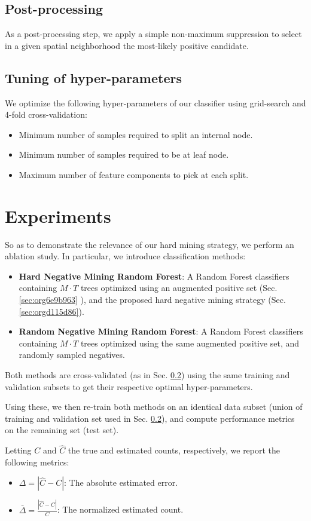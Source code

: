 \documentclass[11pt]{article}
\begin{document}
\subsection{Post-processing}
\label{sec:orgdb8f0f8}

As a post-processing step, we apply a simple non-maximum suppression to select in a given spatial neighborhood
the most-likely positive candidate.

\subsection{Tuning of hyper-parameters}
\label{sec:org47352cc}

We optimize the following hyper-parameters of our classifier using grid-search and 4-fold cross-validation:

\begin{itemize}
\item Minimum number of samples required to split an internal node.
\item Minimum number of samples required to be at leaf node.
\item Maximum number of feature components to pick at each split.
\end{itemize}

\section{Experiments}
\label{sec:org484ed9a}

So as to demonstrate the relevance of our hard mining strategy, we perform an ablation study.
In particular, we introduce classification methods:

\begin{itemize}
\item \textbf{Hard Negative Mining Random Forest}: A Random Forest classifiers containing \(M \cdot T\) trees
optimized using an augmented positive set (Sec. \ref{sec:org6e9b963} ), and the proposed hard negative mining strategy (Sec. \ref{sec:orgd115d86}).
\item \textbf{Random Negative Mining Random Forest}: A Random Forest classifiers containing \(M \cdot T\) trees
optimized using the same augmented positive set, and randomly sampled negatives.
\end{itemize}

Both methods are cross-validated (as in Sec. \ref{sec:org47352cc}) using the same training and validation subsets to get their respective
optimal hyper-parameters.

Using these, we then re-train both methods on an identical data subset (union of training and validation set used in Sec. \ref{sec:org47352cc}), and compute performance metrics on the remaining set (test set).

Letting \(C\) and \(\hat{C}\) the true and estimated counts, respectively, we report the following metrics:

\begin{itemize}
\item \(\Delta = |\hat{C} - C|\): The absolute estimated error.
\item \(\bar{\Delta} = \frac{|\hat{C} - C|}{C}\): The normalized estimated count.
\end{itemize}
\end{document}
